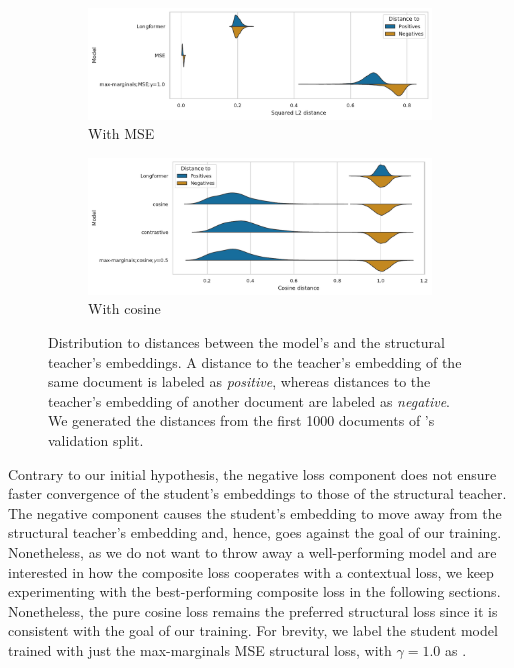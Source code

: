 \begin{figure}
  \centering
  \begin{subfigure}{\textwidth}
    \includegraphics[width=\textwidth]{img/composite_mse_distances.pdf}
    \caption{With MSE}

    \label{fig:composite_mse_distances}

  \end{subfigure}
  \begin{subfigure}{\textwidth}

    \includegraphics[width=\textwidth]{img/composite_cos_distances.pdf}
    \caption{With cosine}

    \label{fig:composite_cos_distances}
  \end{subfigure}

  \caption{Distribution to distances between the model's and the structural
  teacher's embeddings. A distance to the teacher's embedding of the same
  document is labeled as \emph{positive}, whereas distances to the teacher's
  embedding of another document are labeled as \emph{negative}. We generated
  the distances from the first 1000 documents of 's
  validation split.}

  \label{fig:composite_distances}

\end{figure}

Contrary to our initial hypothesis, the negative loss component does not ensure
faster convergence of the student's embeddings to those of the structural
teacher. The negative component causes the student's embedding to move away
from the structural teacher's embedding and, hence, goes against the goal of
our training. Nonetheless, as we do not want to throw away a well-performing
model and are interested in how the composite loss cooperates with a contextual
loss, we keep experimenting with the best-performing composite loss in the
following sections. Nonetheless, the pure cosine loss remains the preferred
structural loss since it is consistent with the goal of our training. For
brevity, we label the student model trained with just the max-marginals MSE
structural loss, with $\gamma=1.0$ as .

